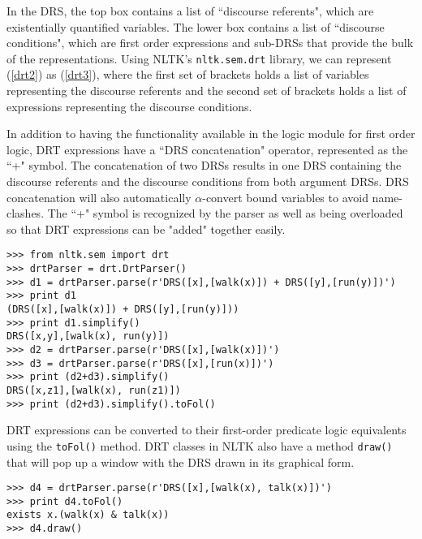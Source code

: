 \documentclass{article}
\newcommand{\dhgdrs}[2]
{
    {
    \it
    \begin{tabular}{|l|}
    \hline
    ~ \vspace{-2ex} \\
    #1
    \\
    ~ \vspace{-2ex} \\
    \hline
    ~ \vspace{-2ex} \\
    #2
    \\
    ~ \\    %
    \hline
    \end{tabular}
    }
}
\newcommand{\dhgcode}[1]{{\tt #1}}
\begin{document}
\enumsentence{\label{drt2}\dhgdrs{j,d}{(John = j)\\dog(d)\\sees(j,d)}}

In the DRS, the top box contains a list of ``discourse referents", which are existentially quantified variables.  The lower box contains a list of ``discourse conditions", which are first order expressions and sub-DRSs that provide the bulk of the representations.  Using NLTK's \dhgcode{nltk.sem.drt} library, we can represent (\ref{drt2}) as (\ref{drt3}), where the first set of brackets holds a list of variables representing the discourse referents and the second set of brackets holds a list of expressions representing the discourse conditions.

\enumsentence{\label{drt3}\dhgcode{DRS([j,d],[(John = j), dog(d), sees(j,d)])}}

In addition to having the functionality available in the logic module for first order logic, DRT expressions have a ``DRS concatenation" operator, represented as the ``+" symbol.  The concatenation of two DRSs results in one DRS containing the discourse referents and the discourse conditions from both argument DRSs.  DRS concatenation will also automatically $\alpha$-convert bound variables to avoid name-clashes.  The ``+" symbol is recognized by the parser as well as being overloaded so that DRT expressions can be "added" together easily.

\begin{verbatim}
>>> from nltk.sem import drt
>>> drtParser = drt.DrtParser()
>>> d1 = drtParser.parse(r'DRS([x],[walk(x)]) + DRS([y],[run(y)])')
>>> print d1
(DRS([x],[walk(x)]) + DRS([y],[run(y)]))
>>> print d1.simplify()
DRS([x,y],[walk(x), run(y)])
>>> d2 = drtParser.parse(r'DRS([x],[walk(x)])')
>>> d3 = drtParser.parse(r'DRS([x],[run(x)])')
>>> print (d2+d3).simplify()
DRS([x,z1],[walk(x), run(z1)])
>>> print (d2+d3).simplify().toFol()
\end{verbatim}

DRT expressions can be converted to their first-order predicate logic equivalents using the \dhgcode{toFol()} method.  DRT classes in NLTK also have a method \dhgcode{draw()} that will pop up a window with the DRS drawn in its graphical form.

\begin{verbatim}
>>> d4 = drtParser.parse(r'DRS([x],[walk(x), talk(x)])')
>>> print d4.toFol()
exists x.(walk(x) & talk(x))
>>> d4.draw()
\end{verbatim}
\end{document}
